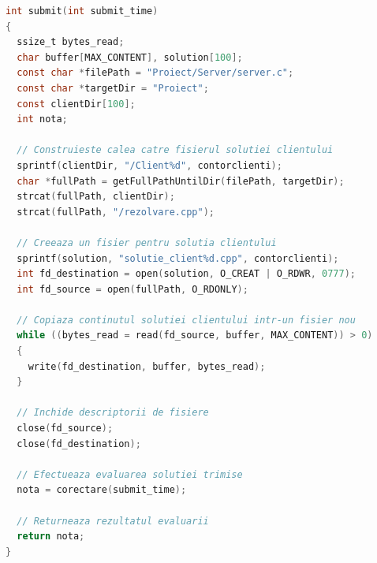 \documentclass[runningheads]{llncs}
\begin{document}
\begin{lstlisting}[language=C, caption={Functia `submit`}, label=submit-function]
int submit(int submit_time)
{
  ssize_t bytes_read;
  char buffer[MAX_CONTENT], solution[100];
  const char *filePath = "Proiect/Server/server.c";
  const char *targetDir = "Proiect";
  const clientDir[100];
  int nota;
    
  // Construieste calea catre fisierul solutiei clientului
  sprintf(clientDir, "/Client%d", contorclienti);
  char *fullPath = getFullPathUntilDir(filePath, targetDir);
  strcat(fullPath, clientDir);
  strcat(fullPath, "/rezolvare.cpp");
    
  // Creeaza un fisier pentru solutia clientului
  sprintf(solution, "solutie_client%d.cpp", contorclienti);
  int fd_destination = open(solution, O_CREAT | O_RDWR, 0777);
  int fd_source = open(fullPath, O_RDONLY);
    
  // Copiaza continutul solutiei clientului intr-un fisier nou
  while ((bytes_read = read(fd_source, buffer, MAX_CONTENT)) > 0)
  {
    write(fd_destination, buffer, bytes_read);
  }
    
  // Inchide descriptorii de fisiere
  close(fd_source);
  close(fd_destination);
    
  // Efectueaza evaluarea solutiei trimise
  nota = corectare(submit_time);
    
  // Returneaza rezultatul evaluarii
  return nota;
}
\end{lstlisting}
\end{document}
